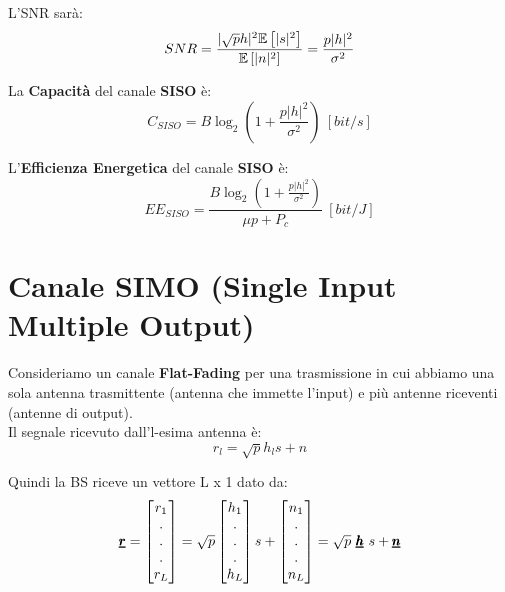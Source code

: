 L'SNR sarà: 
\begin{equation*}
    SNR = \frac{|\sqrt{p}h|^2 \mathbb{E}\left[|s|^2\right]} {\mathbb{E}\left[|n|^2\right]} = \frac{p|h|^2}{\sigma^2}
\end{equation*}

La \textbf{Capacità} del canale \textbf{SISO} è:
\begin{equation*}
    C_{SISO} = B\log_2 \left(1 +  \frac{p|h|^2}{\sigma^2} \right) \ [bit/s]
\end{equation*}

L'\textbf{Efficienza Energetica} del canale \textbf{SISO} è:
\begin{equation*}
    EE_{SISO} =\frac{B\log_2 \left(1 +  \frac{p|h|^2}{\sigma^2} \right)}{\mu p + P_c} \ [bit/J]
\end{equation*}
\pagebreak 


\section{Canale SIMO (Single Input Multiple Output)}
Consideriamo un canale \textbf{Flat-Fading} per una trasmissione in cui abbiamo una sola antenna trasmittente (antenna che immette l'input) e più antenne riceventi (antenne di output).\\

Il segnale ricevuto dall'l-esima antenna è:
\begin{equation*}
    r_l = \sqrt{p} h_l s + n
\end{equation*}

Quindi la BS riceve un vettore L x 1 dato da:
\begin{equation*}
    \pmb{\underline{r}} = \begin{bmatrix}
    r_1\\.\\.\\.\\r_L
    \end{bmatrix} = 
    \sqrt{p} \begin{bmatrix}
    h_1\\.\\.\\.\\h_L
    \end{bmatrix} s + 
    \begin{bmatrix}
    n_1\\.\\.\\.\\n_L
    \end{bmatrix} = \sqrt{p} \ \pmb{\underline{h}} \ s + \pmb{\underline{n}}
\end{equation*}

